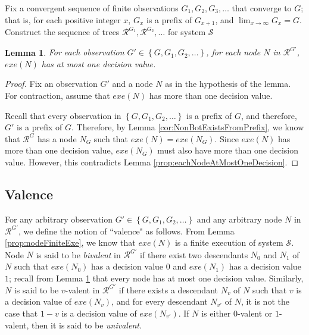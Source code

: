 \documentclass[11pt]{article}
\numberwithin{theorem}{section}
\newtheorem{lemma}[theorem]{Lemma}
\newcommand{\set}[1]{\left\{#1\right\}}
\begin{document}
Fix a convergent sequence of finite observations $G_1, G_2, G_3, \ldots$ that converge to $G$; that is, for each positive integer $x$, $G_x$ is a prefix of $G_{x+1}$, and $\lim_{x \rightarrow \infty} G_x = G$. Construct the sequence of trees $\mathcal{R}^{G_1}, \mathcal{R}^{G_2}, \ldots$ for system $\mathcal{S}$


\begin{lemma}\label{prop:eachNodeAtMostOneDecisionInAllGs}
 For each observation $G' \in \set{G, G_1, G_2, \ldots }$, for each node $N$ in $\mathcal{R}^{G'}$, $exe(N)$ has at most one decision value.
\end{lemma}
\begin{proof}
Fix an observation $G'$ and a node $N$ as in the hypothesis of the lemma. For contraction, assume that $exe(N)$ has more than one decision value.

Recall that every observation in $\set{G, G_1, G_2, \ldots }$ is a prefix of $G$, and therefore, $G'$ is a prefix of $G$. Therefore, by Lemma \ref{cor:NonBotExistsFromPrefix}, we know that $\mathcal{R}^G$ has a node $N_G$ such that $exe(N) = exe(N_G)$. Since $exe(N)$ has more than one decision value, $exe(N_G)$ must also have more than one decision value. However, this contradicts Lemma \ref{prop:eachNodeAtMostOneDecision}.
\end{proof}


\subsection{Valence}\label{subsec:valence}

For any arbitrary observation $G' \in \set{G, G_1, G_2, \ldots }$ and any arbitrary node $N$ in $\mathcal{R}^{G'}$, we define the notion of ``valence" as follows. From Lemma
\ref{prop:nodeFiniteExe}, we know that $exe(N)$ is a finite execution
of system $\mathcal{S}$. Node $N$ is said to be \emph{bivalent} in $\mathcal{R}^{G'}$ if
there exist two descendants $N_0$ and $N_1$ of $N$ such that
$exe(N_0)$ has a decision value $0$ and $exe(N_1)$ has a decision
value $1$; recall from Lemma
\ref{prop:eachNodeAtMostOneDecisionInAllGs} that every node has at most one
decision value.  Similarly, $N$ is said to be $v$-valent in $\mathcal{R}^{G'}$ if there exists a descendant
$N_v$ of $N$ such that $v$ is a decision value of $exe(N_v)$, and for
every descendant $N_{v'}$ of $N$, it is not the case that $1-v$ is a
decision value of $exe(N_{v'})$. If $N$ is either $0$-valent or
$1$-valent, then it is said to be \emph{univalent}.
\end{document}
